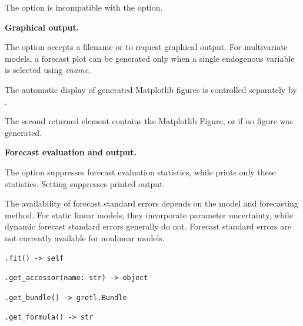 {	The  option is incompatible
	with the  option.
	
	\textbf{Graphical output.}
	
	The  option accepts a filename or
	 to request graphical output.
	For multivariate models, a forecast plot can be
	generated only when a single endogenous variable
	is selected using \textit{vname}.
	
	The automatic display of generated Matplotlib figures
	is controlled separately by
	.
	
	The second returned element contains the Matplotlib
	Figure, or  if no figure was generated.
	
	\textbf{Forecast evaluation and output.}
	
	The  option suppresses forecast
	evaluation statistics, while 
	prints only these statistics. Setting
	 suppresses printed output.
	
	The availability of forecast standard errors depends
	on the model and forecasting method. For static linear
	models, they incorporate parameter uncertainty, while
	dynamic forecast standard errors generally do not.
	Forecast standard errors are not currently available
	for nonlinear models.}

\begin{lstlisting}[style=pythonstylefoot]
.fit() -> self
\end{lstlisting}

\label{met:gretlmodel::get_accessor}
\begin{lstlisting}[style=pythonstylefoot]
.get_accessor(name: str) -> object
\end{lstlisting}

\begin{lstlisting}[style=pythonstylefoot]
.get_bundle() -> gretl.Bundle
\end{lstlisting}

\begin{lstlisting}[style=pythonstylefoot]
.get_formula() -> str
\end{lstlisting}

